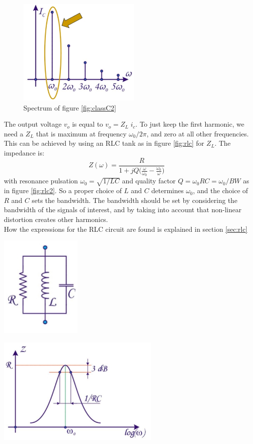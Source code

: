 \begin{figure}[h!]
	\centering
	\includegraphics[width=6cm]{figures/ch09/classC3.jpg}
	\caption{Spectrum of figure \ref{fig:classC2}}
	\label{fig:classC3}
\end{figure}
The output voltage $v_o$ is equal to $v_o = Z_L \; i_c$. To just keep  the first harmonic, we need a $Z_L$ that is maximum at frequency $\omega_0 / 2\pi$, and zero at all other frequencies. This can be achieved by using an RLC tank as in figure \ref{fig:rlc} for $Z_L$. The impedance is:
$$
Z(\omega) = \frac{R}{1 + jQ \Big(\frac{\omega}{\omega_0} - \frac{\omega_0}{\omega}\Big)}
$$
with resonance pulsation $\omega_0 = \sqrt{1/LC}$ and quality factor $Q = \omega_0 RC = \omega_0/BW$ as in figure \ref{fig:rlc2}. So a proper choice of $L$ and $C$ determines $\omega_0$, and the choice of $R$ and $C$ sets the bandwidth. The bandwidth should be set by considering the bandwidth of the signals of interest, and by taking into account that non-linear distortion creates other harmonics.\\
How the expressions for the RLC circuit are found is explained in section \ref{sec:rlc}

\begin{minipage}{.5\textwidth}
	\centering
	\includegraphics[width=4cm]{figures/ch09/rlc.jpg}
	\label{fig:rlc}
\end{minipage}%
\begin{minipage}{.5\textwidth}
	\centering
	\includegraphics[width=8cm]{figures/ch09/rlc2.jpg}
	\label{fig:rlc2}
\end{minipage}

